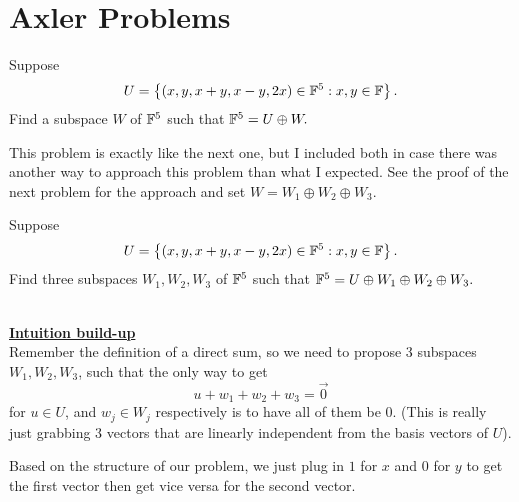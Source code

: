 \documentclass[answers]{exam}
\begin{document}
\section{Axler Problems}
\begin{questions}
    \question Suppose
    \[  
        U = \left\{\left(x,y,x+y,x-y,2x\right)\in\mathbb{F}^5:x,y\in\mathbb{F}\right\}.
    \]
    Find a subspace $W$ of $\mathbb{F}^5$ such that $\mathbb{F}^5 = U\oplus W.$
    \begin{solution}
        This problem is exactly like the next one, but I included both in  case there was another way to approach
        this problem than what I expected. See the proof of the next problem for the approach and set 
        $W = W_1\oplus W_2\oplus W_3$.
    \end{solution}

    \question Suppose
    \[  
        U = \left\{\left(x,y,x+y,x-y,2x\right)\in\mathbb{F}^5:x,y\in\mathbb{F}\right\}.
    \]
    Find three subspaces $W_1,W_2,W_3$ of $\mathbb{F}^5$ such that $\mathbb{F}^5 = U\oplus W_1\oplus W_2\oplus W_3.$
    \begin{solution}\,\\
        \underline{\textbf{Intuition build-up}}\\
        Remember the definition of a direct sum, so we need to propose $3$ subspaces $W_1,W_2,W_3$, such that the only way to get 
        \[
            u + w_1 + w_2 + w_3 = \vec{0}
        \]
        for $u\in U$, and $w_j\in W_j$ respectively is to have all of them be 0. (This is really just grabbing 
        $3$ vectors that are linearly independent from the basis vectors of $U$).

        Based on the structure of our problem, we just plug in $1$ for $x$ and $0$ for $y$ to get the first
        vector then get vice versa for the second vector.


\end{solution}
\end{questions}
\end{document}
